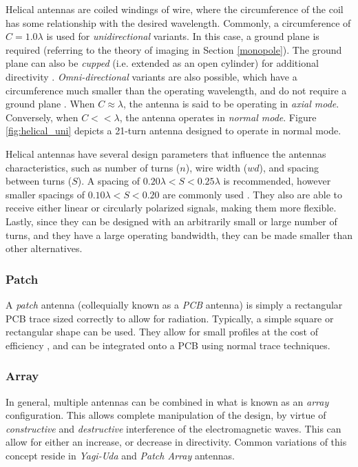 Helical antennas are coiled windings of wire, where the circumference of the coil has some relationship with the desired wavelength. Commonly, a circumference of $C = 1.0 \lambda$ is used for \textit{unidirectional} variants. In this case, a ground plane is required (referring to the theory of imaging in Section \ref{monopole}). The ground plane can also be \textit{cupped} (i.e. extended as an open cylinder) for additional directivity \cite{textbook-antennaTheoryAnalysisDesign}. \textit{Omni-directional} variants are also possible, which have a circumference much smaller than the operating wavelength, and do not require a ground plane \cite{site-helixAntennas}. When $C \approx \lambda$, the antenna is said to be operating in \textit{axial mode}. Conversely, when $C << \lambda$, the antenna operates in \textit{normal mode}. Figure \ref{fig:helical_uni} depicts a 21-turn antenna designed to operate in normal mode.

Helical antennas have several design parameters that influence the antennas characteristics, such as number of turns ($n$), wire width ($wd$), and spacing between turns ($S$). A spacing of $0.20 \lambda < S < 0.25 \lambda$ is recommended, however smaller spacings of $0.10 \lambda < S < 0.20$ are commonly used \cite{site-helicalCalculator}. They also are able to receive either linear or circularly polarized signals, making them more flexible. Lastly, since they can be designed with an arbitrarily small or large number of turns, and they have a large operating bandwidth, they can be made smaller than other alternatives.

\subsubsection{Patch}
A \textit{patch} antenna (collequially known as a \textit{PCB} antenna) is simply a rectangular PCB trace sized correctly to allow for radiation. Typically, a simple square or rectangular shape can be used. They allow for small profiles at the cost of efficiency \cite{site-antennaTheory}, and can be integrated onto a PCB using normal trace techniques.

\subsubsection{Array}
In general, multiple antennas can be combined in what is known as an \textit{array} configuration. This allows complete manipulation of the design, by virtue of \textit{constructive} and \textit{destructive} interference of the electromagnetic waves. This can allow for either an increase, or decrease in directivity. Common variations of this concept reside in \textit{Yagi-Uda} and \textit{Patch Array} antennas. \cite{site-antennaTheory}

